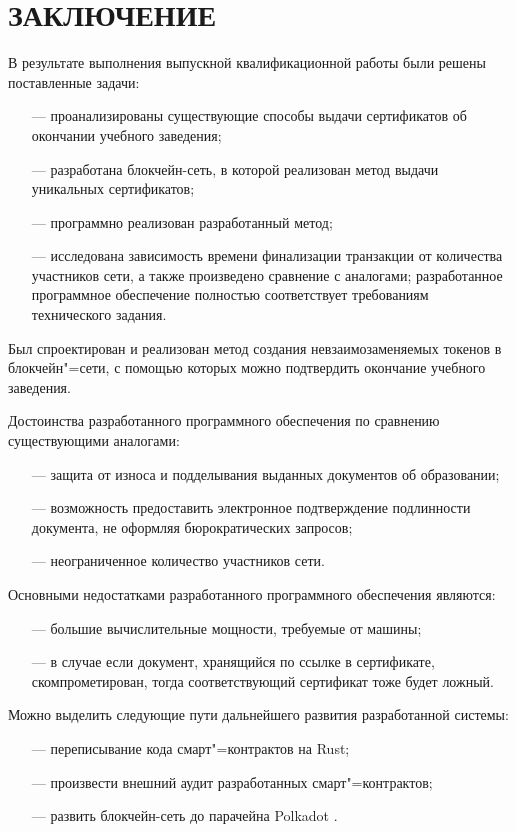 \section*{ЗАКЛЮЧЕНИЕ}


В результате выполнения выпускной квалификационной работы были решены поставленные задачи:
\begin{itemize}[leftmargin=1.6\parindent]
	\item[---] проанализированы существующие способы выдачи сертификатов об окончании учебного заведения;
	\item[---] разработана блокчейн-сеть, в которой реализован метод выдачи уникальных сертификатов;
	\item[---] программно реализован разработанный метод;
	\item[---] исследована зависимость времени финализации транзакции от количества участников сети, а также произведено сравнение с аналогами; разработанное программное обеспечение полностью соответствует требованиям технического задания.
\end{itemize}

Был спроектирован и реализован метод создания невзаимозаменяемых токенов в блокчейн"=сети, с помощью которых можно подтвердить окончание учебного заведения.

Достоинства разработанного программного обеспечения по сравнению существующими аналогами:
\begin{itemize}[leftmargin=1.6\parindent]
	\item[---] защита от износа и подделывания выданных документов об образовании;
	\item[---] возможность предоставить электронное подтверждение подлинности документа, не оформляя бюрократических запросов;
	\item[---] неограниченное количество участников сети.
\end{itemize}

Основными недостатками разработанного программного обеспечения являются:
\begin{itemize}[leftmargin=1.6\parindent]
	\item[---] большие вычислительные мощности, требуемые от машины;
	\item[---] в случае если документ, хранящийся по ссылке в сертификате, скомпрометирован, тогда соответствующий сертификат тоже будет ложный.
\end{itemize}


Можно выделить следующие пути дальнейшего развития разработанной системы:
\begin{itemize}[leftmargin=1.6\parindent]
	\item[---] переписывание кода смарт"=контрактов на Rust;
	\item[---] произвести внешний аудит разработанных смарт"=контрактов;
	\item[---] развить блокчейн-сеть до парачейна Polkadot \cite{parachain}.
\end{itemize}

\pagebreak